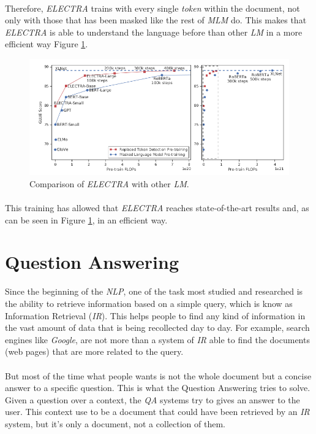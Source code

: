 \paragraph{}
Therefore, \emph{ELECTRA} trains with every single \emph{token} within the document, not only with those that has been masked like the rest of \emph{MLM} do. This makes that \emph{ELECTRA} is able to understand the language before than other \emph{LM} in a more efficient way Figure \ref{fig:compare-electra}.
\begin{figure}[h!]
	\centering
	\includegraphics[scale=0.45]{images/compareelectra}
	\caption{Comparison of \emph{ELECTRA} with other \emph{LM}.}
	\label{fig:compare-electra}
\end{figure}
\paragraph{}
This training has allowed that \emph{ELECTRA} reaches state-of-the-art results and, as can be seen in Figure \ref{fig:compare-electra}, in an efficient way. 
\section{Question Answering}
\label{sec:QuestionAnswering}
\noindent Since the beginning of the \emph{NLP}, one of the task most studied and researched is the ability to retrieve information based on a simple query, which is know as Information Retrieval (\emph{IR}). This helps people to find any kind of information in the vast amount of data that is being recollected day to day. For example, search engines like \emph{Google}, are not more than a system of \emph{IR} able to find the documents (web pages) that are more related to the query.
\paragraph{}
But most of the time what people wants is not the whole document but a concise answer to a specific question. This is what the Question Answering tries to solve. Given a question over a context, the \emph{QA} systems try to gives an answer to the user. This context use to be a document that could have been retrieved by an \emph{IR} system, but it's only a document, not a collection of them.
